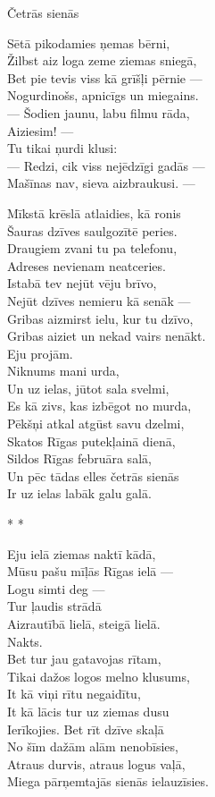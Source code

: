 \documentclass[14pt]{extarticle}
\begin{document}
{{\newpage
{\large \sc Četrās sienās}

Sētā pikodamies ņemas bērni,\\
Žilbst aiz loga zeme ziemas sniegā,\\
Bet pie tevis viss kā grīšļi pērnie ---\\
Nogurdinošs, apnicīgs un miegains.\\
--- Šodien jaunu, labu filmu rāda,\\
Aiziesim! ---\\
Tu tikai ņurdi klusi:\\
--- Redzi, cik viss nejēdzīgi gadās ---\\
Mašīnas nav, sieva aizbraukusi. ---

Mīkstā krēslā atlaidies, kā ronis\\
Šauras dzīves saulgozītē peries.\\
Draugiem zvani tu pa telefonu,\\
Adreses nevienam neatceries.\\
Istabā tev nejūt vēju brīvo,\\
Nejūt dzīves nemieru kā senāk ---\\
Gribas aizmirst ielu, kur tu dzīvo,\\
Gribas aiziet un nekad vairs nenākt.\\
Eju projām.\\
Niknums mani urda,\\
Un uz ielas, jūtot sala svelmi,\\
Es kā zivs, kas izbēgot no murda,\\
Pēkšņi atkal atgūst savu dzelmi,\\
Skatos Rīgas putekļainā dienā,\\
Sildos Rīgas februāra salā,\\
Un pēc tādas elles četrās sienās\\
Ir uz ielas labāk galu galā.

\newpage
{\large \sc * * *}

Eju ielā ziemas naktī kādā,\\
Mūsu pašu mīļās Rīgas ielā ---\\
Logu simti deg ---\\
Tur ļaudis strādā\\
Aizrautībā lielā, steigā lielā.\\
Nakts.\\
Bet tur jau gatavojas rītam,\\
Tikai dažos logos melno klusums,\\
It kā viņi rītu negaidītu,\\
It kā lācis tur uz ziemas dusu\\
Ierīkojies. Bet rīt dzīve skaļā\\
No šīm dažām alām nenobīsies,\\
Atraus durvis, atraus logus vaļā,\\
Miega pārņemtajās sienās ielauzīsies.

}}
\end{document}
